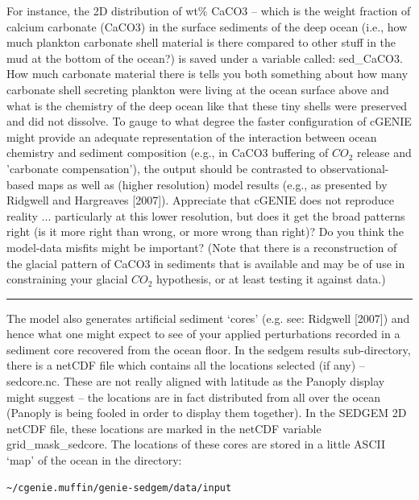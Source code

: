 \documentclass[11pt,fleqn]{book} %
\begin{document}
For instance, the 2D distribution of wt\% CaCO3 – which is the weight fraction of calcium carbonate (CaCO3) in the surface sediments of the deep ocean (i.e., how much plankton carbonate shell material is there compared to other stuff in the mud at the bottom of the ocean?) is saved under a variable called: sed\_CaCO3. How much carbonate material there is tells you both something about how many carbonate shell secreting plankton were living at the ocean surface above and what is the chemistry of the deep ocean like that these tiny shells were preserved and did not dissolve. To gauge to what degree the faster configuration of cGENIE might provide an adequate representation of the interaction between ocean chemistry and sediment composition (e.g., in CaCO3 buffering of \(CO_{2}\) release and 'carbonate compensation'), the output should be contrasted to observational-based maps as well as (higher resolution) model results (e.g., as presented by Ridgwell and Hargreaves [2007]). Appreciate that cGENIE does not reproduce reality ... particularly at this lower resolution, but does it get the broad patterns right (is it more right than wrong, or more wrong than right)? Do you think the model-data misfits might be important? (Note that there is a reconstruction of the glacial pattern of CaCO3 in sediments that is available and may be of use in constraining your glacial \(CO_{2}\) hypothesis, or at least testing it against data.)

\vspace{1mm}
\noindent\rule{4cm}{0.1mm}
\vspace{2mm}

The model also generates artificial sediment ‘cores’ (e.g. see: Ridgwell [2007]) and hence what one might expect to see of your applied perturbations recorded in a sediment core recovered from the ocean floor. In the sedgem results sub-directory, there is a netCDF file which contains all the locations selected (if any) – sedcore.nc. These are not really aligned with latitude as the Panoply display might suggest – the locations are in fact distributed from all over the ocean (Panoply is being fooled in order to display them together). In the SEDGEM 2D netCDF file, these locations are marked in the netCDF variable grid\_mask\_sedcore. The locations of these cores are stored in a little ASCII ‘map’ of the ocean in the directory:

\begin{verbatim}
~/cgenie.muffin/genie-sedgem/data/input
\end{verbatim}
\end{document}
